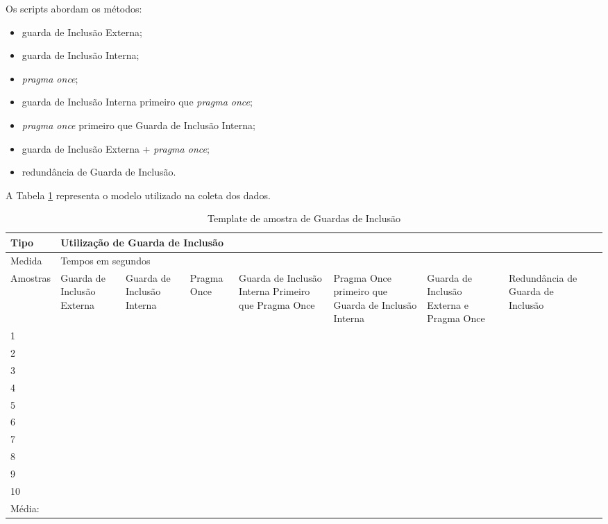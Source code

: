 Os scripts abordam os métodos:

\begin{itemize}
	\item guarda de Inclusão Externa;
	\item guarda de Inclusão Interna;
	\item \textit{pragma once};
	\item guarda de Inclusão Interna primeiro que \textit{pragma once};
	\item \textit{pragma once} primeiro que  Guarda de Inclusão Interna;
	\item guarda de Inclusão Externa + \textit{pragma once};
	\item redundância de Guarda de Inclusão.
\end{itemize}


A Tabela \ref{tab:modelo_guards} representa o modelo utilizado na coleta dos
 dados.


\begin{table}[h]
\centering
\begin{tabular}{|l|p{1.5cm}|p{1.5cm}|p{1.5cm}|p{1.5cm}|p{2cm}|p{2cm}|p{2cm}|p{2cm}|}
\hline
Tipo & \multicolumn{7}{l|}{Utilização de Guarda de Inclusão} \\ \hline
Medida & \multicolumn{7}{l|}{Tempos em segundos } \\ \hline
Amostras & Guarda de Inclusão Externa & Guarda de Inclusão Interna & Pragma Once & Guarda de Inclusão Interna Primeiro que Pragma Once & Pragma Once primeiro que Guarda de Inclusão Interna & Guarda de Inclusão Externa e Pragma Once & Redundância de Guarda de Inclusão \\ \hline
 1  &  &  &   &   &   &  & \\ \hline
 2  &  &  &   &   &   &  & \\ \hline
 3  &  &  &   &   &   &  & \\ \hline
 4  &  &  &   &   &   &  & \\ \hline
 5  &  &  &   &   &   &  & \\ \hline
 6  &  &  &   &   &   &  & \\ \hline
 7  &  &  &   &   &   &  & \\ \hline 
 8  &  &  &   &   &   &  & \\ \hline
 9  &  &  &   &   &   &  & \\ \hline
 10 &  &  &   &   &   &  & \\ \hline
 Média: &  &  & & &   &  & \\ \hline
\end{tabular}
\caption{Template de amostra de Guardas de Inclusão}
\label{tab:modelo_guards}
\end{table}


